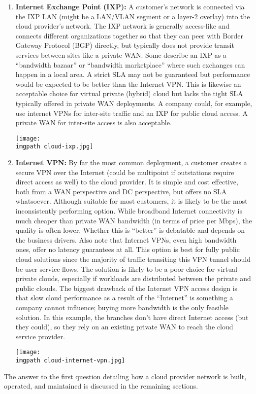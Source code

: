\begin{enumerate}
  \item \textbf{Internet Exchange Point (IXP):} A customer’s network is
  connected via the IXP LAN (might be a LAN/VLAN segment or a layer-2 overlay)
  into the cloud provider’s network. The IXP network is generally access-like
  and connects different organizations together so that they can peer with
  Border Gateway Protocol (BGP) directly, but typically does not provide
  transit services between sites like a private WAN\@. Some describe an IXP as a
  ``bandwidth bazaar'' or ``bandwidth marketplace'' where such exchanges can
  happen in a local area. A strict SLA may not be guaranteed but performance
  would be expected to be better than the Internet VPN\@. This is likewise an
  acceptable choice for virtual private (hybrid) cloud but lacks the tight SLA
  typically offered in private WAN deployments. A company could, for example,
  use internet VPNs for inter-site traffic and an IXP for public cloud access.
  A private WAN for inter-site access is also acceptable.

    \begin{minipage}[t]{\linewidth}
	  \centering
      \texttt{[image: \\imgpath cloud-ixp.jpg]}
    \end{minipage}

  \item \textbf{Internet VPN:} By far the most common deployment, a customer
  creates a secure VPN over the Internet (could be multipoint if outstations
  require direct access as well) to the cloud provider. It is simple and cost
  effective, both from a WAN perspective and DC perspective, but offers no SLA
  whatsoever. Although suitable for most customers, it is likely to be the
  most inconsistently performing option. While broadband Internet connectivity
  is much cheaper than private WAN bandwidth (in terms of price per Mbps), the
  quality is often lower. Whether this is ``better'' is debatable and depends on
  the business drivers. Also note that Internet VPNs, even high bandwidth
  ones, offer no latency guarantees at all. This option is best for fully
  public cloud solutions since the majority of traffic transiting this VPN
  tunnel should be user service flows. The solution is likely to be a poor
  choice for virtual private clouds, especially if workloads are distributed
  between the private and public clouds. The biggest drawback of the Internet
  VPN access design is that slow cloud performance as a result of the
  ``Internet'' is something a company cannot influence; buying more bandwidth is
  the only feasible solution. In this example, the branches don’t have direct
  Internet access (but they could), so they rely on an existing private WAN to
  reach the cloud service provider.

    \begin{minipage}[t]{\linewidth}
	  \centering
      \texttt{[image: \\imgpath cloud-internet-vpn.jpg]}
    \end{minipage}
\end{enumerate}

The answer to the first question detailing how a cloud provider network is
built, operated, and maintained is discussed in the remaining sections.
